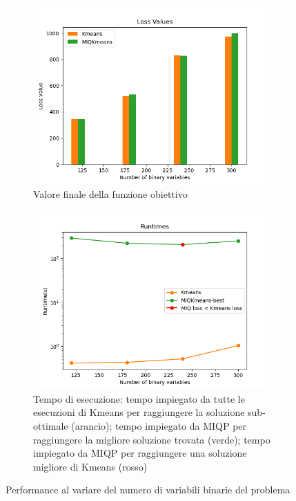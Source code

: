 \documentclass{article}
\begin{document}
    \begin{figure}[H]
        \centering
        \begin{subfigure}[t]{0.49\linewidth}
            \centering
            \includegraphics[width=\linewidth]{../results/log_plots/loss_multiple_inits_heart}
            \caption{Valore finale della funzione obiettivo}
        \end{subfigure}
        \hfill
        \begin{subfigure}[t]{0.49\linewidth}
            \centering
            \includegraphics[width=\linewidth]{../results/log_plots/runtime_multiple_inits_heart_log}
            \caption{Tempo di esecuzione: tempo impiegato da tutte le esecuzioni di Kmeans per raggiungere la soluzione sub-ottimale (arancio); tempo impiegato da MIQP per raggiungere la migliore soluzione trovata (verde); tempo impiegato da MIQP per raggiungere una soluzione migliore di Kmeans (rosso)}
        \end{subfigure}
            \caption{Performance al variare del numero di variabili binarie del problema}
            \label{fig:multi_init}
    \end{figure}
\end{document}
